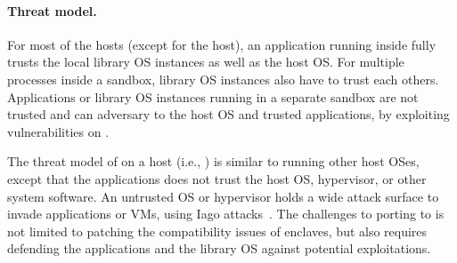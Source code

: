 \paragraph{Threat model.}
For most of the \graphene{} hosts (except for the \sgx{} host),
an application running inside \graphene{} fully trusts the local library OS instances
as well as the host OS.
For multiple processes inside a sandbox,
library OS instances also have to trust each others.
Applications or library OS instances running in a separate sandbox
are not trusted
and can adversary to the host OS and
trusted applications,
by exploiting vulnerabilities on \thehostabi{}.




The threat model of \graphene{} on a \sgx{} host (i.e., \graphenesgx{})
is similar to running other host OSes, except that the applications does not trust the host OS, hypervisor, or other system software.
An untrusted OS or hypervisor
holds a wide attack surface to invade applications or VMs,
using Iago attacks~\cite{checkoway13iago}.
The challenges to porting \graphene{} to \sgx{} is not limited to patching the compatibility issues of enclaves, but also requires defending the applications and the library OS against potential exploitations.







